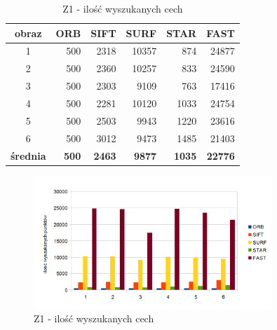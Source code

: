 \begin{table}[htbp]
  \centering
  \caption{Z1 - ilość wyszukanych cech}
    \begin{tabular}{|c|r|r|r|r|r|}\hline
    
    obraz & \textbf{ORB} & \textbf{SIFT} & \textbf{SURF} & \textbf{STAR} & \textbf{FAST} \\\hline
    
   
    1 & 500 & 2318 & 10357 & 874 & 24877 \\
    2 & 500 & 2360 & 10257 & 833 & 24590 \\
    3 & 500 & 2303 & 9109 & 763 & 17416 \\
    4 & 500 & 2281 & 10120 & 1033 & 24754 \\
    5 & 500 & 2503 & 9943 & 1220 & 23616 \\
    6 & 500 & 3012 & 9473 & 1485 & 21403 \\\hline
    \textbf{średnia} & \textbf{500} & \textbf{2463} & \textbf{9877} & \textbf{1035} & \textbf{22776} \\
    \hline
    \end{tabular}%
  \label{tab:z1_f1}%
\end{table}%


\begin{figure}
\centering
\includegraphics[width=0.8\textwidth]{pict/slowik/z1/F1.png}
\caption{Z1 - ilość wyszukanych cech}
\label{fig:z1_f1}
\end{figure}


